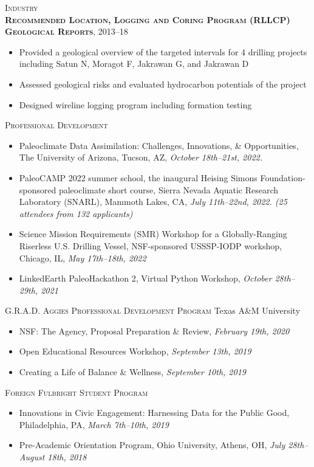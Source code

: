 \documentclass[10pt, letter]{article}
\newcommand{\margintext}[1]{\marginnote{\normalsize\textbf #1 |}}
\begin{document}
\bigskip
\textsc{Industry} \\
\textsc{\textbf{Recommended Location, Logging and Coring Program (RLLCP) Geological Reports}}, 2013–18
\begin{itemize}[leftmargin=*]
    \item Provided a geological overview of the targeted intervals for 4 drilling projects including Satun N, Moragot F, Jakrawan G, and Jakrawan D
    \item Assessed geological risks and evaluated hydrocarbon potentials of the project
    \item Designed wireline logging program including formation testing
\end{itemize} 

\bigskip
\margintext{Workshops}
\textsc{Professional Development}

\begin{itemize}[leftmargin=*]
    \item[] Paleoclimate Data Assimilation: Challenges, Innovations, \& Opportunities, The University of Arizona, Tucson, AZ, \textit{October 18th–21st, 2022.}
    \item[] PaleoCAMP 2022 summer school, the inaugural Heising Simons Foundation-sponsored paleoclimate short course, Sierra Nevada Aquatic Research Laboratory (SNARL), Mammoth Lakes, CA, \textit{July 11th–22nd, 2022. (25 attendees from 132 applicants)}
    \item[] Science Mission Requirements (SMR) Workshop for a Globally-Ranging Riserless U.S. Drilling Vessel, NSF-sponsored USSSP-IODP workshop, Chicago, IL, \textit{May 17th–18th, 2022}
    \item[] LinkedEarth PaleoHackathon 2, Virtual Python Workshop, \textit{October 28th–29th, 2021 }
\end{itemize} 

\bigskip
\textsc{G.R.A.D. Aggies Professional Development Program} \hfill Texas A\&M University
\begin{itemize}[leftmargin=*]
    \item[] NSF: The Agency, Proposal Preparation \& Review, \textit{February 19th, 2020}
    \item[] Open Educational Resources Workshop, \textit{September 13th, 2019}
    \item[] Creating a Life of Balance \& Wellness, \textit{September 10th, 2019}
\end{itemize} 

\bigskip
\textsc{Foreign Fulbright Student Program}
\begin{itemize}[leftmargin=*]
    \item[] Innovations in Civic Engagement: Harnessing Data for the Public Good, Philadelphia, PA, \textit{March 7th–10th, 2019}
    \item[] Pre-Academic Orientation Program, Ohio University, Athens, OH, \textit{July 28th–August 18th, 2018}
\end{itemize} 
\end{document}
